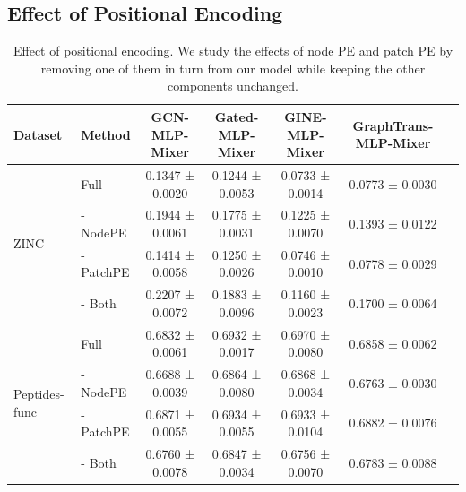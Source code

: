\documentclass{article}
\begin{document}

\subsection{Effect of Positional Encoding}

\begin{table}[!ht]
    \centering
    \small
    \caption{Effect of positional encoding. We study the effects of node PE and patch PE by removing one of them in turn from our model while keeping the other components unchanged.}
    \label{tab: node PE and patch PE}
    \begin{tabular}{llccccc}
    \toprule
    Dataset &Method&  GCN-MLP-Mixer & Gated-MLP-Mixer & GINE-MLP-Mixer & GraphTrans-MLP-Mixer\\
         \midrule
    \multirow{4}{*}{ZINC}
    & Full     
    & 0.1347 ± 0.0020	
    & 0.1244 ± 0.0053 
    & 0.0733 ± 0.0014 
    & 0.0773 ± 0.0030\\
    & - NodePE
    & 0.1944 ± 0.0061	
    & 0.1775 ± 0.0031
    & 0.1225 ± 0.0070	
    & 0.1393 ± 0.0122\\
    & - PatchPE
    &0.1414 ± 0.0058	
    &0.1250 ± 0.0026
    &0.0746 ± 0.0010	
    &0.0778 ± 0.0029\\
    & - Both
    &0.2207 ± 0.0072
    &0.1883 ± 0.0096
    &0.1160 ± 0.0023
    &0.1700 ± 0.0064\\
    \midrule
    \multirow{4}{*}{Peptides-func}
    & Full     
    & 0.6832 ± 0.0061
    & 0.6932 ± 0.0017
    & 0.6970 ± 0.0080		
    & 0.6858 ± 0.0062\\
    & - NodePE
    & 0.6688 ± 0.0039
    & 0.6864 ± 0.0080
    & 0.6868 ± 0.0034		
    & 0.6763 ± 0.0030\\
    & - PatchPE
    & 0.6871 ± 0.0055
    & 0.6934 ± 0.0055
    & 0.6933 ± 0.0104		
    & 0.6882 ± 0.0076\\
    & - Both
    & 0.6760 ± 0.0078
    & 0.6847 ± 0.0034
    & 0.6756 ± 0.0070		
    & 0.6783 ± 0.0088\\
    \bottomrule
    \end{tabular}
\end{table}
\end{document}
